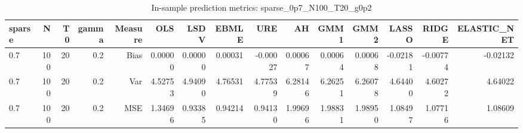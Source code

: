 \begin{table}[!htbp]\centering
\caption{In-sample prediction metrics: sparse_0p7_N100_T20_g0p2}
\label{tab:table2_sparse_0p7_N100_T20_g0p2}
\begin{tabular}{lrrrrrrrrrrrrrr}
\hline
sparse & N & T0 & gamma & Measure & OLS & LSDV & EBMLE & URE & AH & GMM1 & GMM2 & LASSO & RIDGE & ELASTIC_NET \\
\hline
0.7 & 100 & 20 & 0.2 & Bias & 0.00000 & 0.00000 & 0.00031 & -0.00027 & 0.00067 & 0.00064 & 0.00068 & -0.02181 & -0.00774 & -0.02132 \\
0.7 & 100 & 20 & 0.2 & Var & 4.52753 & 4.94090 & 4.76531 & 4.77539 & 6.28146 & 6.26251 & 6.26078 & 4.64400 & 4.60272 & 4.64022 \\
0.7 & 100 & 20 & 0.2 & MSE & 1.34696 & 0.93385 & 0.94214 & 0.94130 & 1.99696 & 1.98831 & 1.98950 & 1.08497 & 1.07716 & 1.08609 \\
\hline
\end{tabular}
\end{table}

